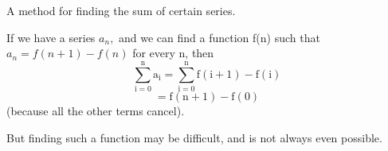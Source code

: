 A method for finding the sum of certain series.
\par
If we have a series ${a_{n}},$  and we can find a function 
f(n) such that $a_{n}=f(n+1)-f(n)$  for every n,
then
\[ \sum _{\mathrm{i} =0 } ^{\mathrm{n}} \mathrm{a}_{\mathrm{i}}
= \sum _{\mathrm{i} =0 } ^{\mathrm{n}} \mathrm{f(i+1)-f(i)} \]
\[ = \mathrm{f(n+1)-f(0)} \] 
(because all the other terms cancel).
\par
But finding such a function may be difficult, and is not always even
possible.